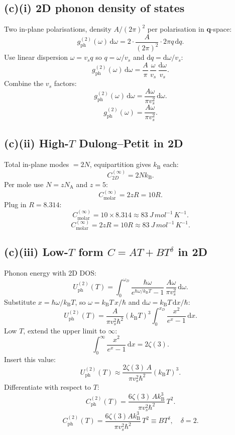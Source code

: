 \documentclass[11pt]{article}
\newcommand{\de}{\mathrm{d}}
\newcommand{\kB}{k_{\mathrm{B}}}
\newcommand{\NA}{N_{\mathrm{A}}}
\begin{document}
\subsection*{(c)(i) 2D phonon density of states}

Two in-plane polarisations, density $A/(2\pi)^2$ per polarisation in $\mathbf q$-space:
\[
g_{\mathrm{ph}}^{(2)}(\omega)\,\de\omega = 2\cdot\frac{A}{(2\pi)^2}\cdot 2\pi q\,\de q.
\]
Use linear dispersion $\omega = v_s q$ so $q = \omega/v_s$ and $\de q = \de\omega/v_s$:
\[
g_{\mathrm{ph}}^{(2)}(\omega)\,\de\omega = \frac{A}{\pi}\,\frac{\omega}{v_s}\,\frac{\de\omega}{v_s}.
\]
Combine the $v_s$ factors:
\[
g_{\mathrm{ph}}^{(2)}(\omega)\,\de\omega = \frac{A\omega}{\pi v_s^2}\,\de\omega.
\]
\begin{equation}
\boxed{\ g_{\mathrm{ph}}^{(2)}(\omega) = \frac{A\omega}{\pi v_s^2}.\ }
\label{eq:g2Dbox}
\end{equation}

\subsection*{(c)(ii) High-$T$ Dulong--Petit in 2D}

Total in-plane modes $=2N$, equipartition gives $\kB$ each:
\[
C^{(\infty)}_{2D} = 2N\kB.
\]
Per mole use $N=z\NA$ and $z=5$:
\[
C^{(\infty)}_{\mathrm{molar}} = 2zR = 10R.
\]
Plug in $R=8.314$:
\[
C^{(\infty)}_{\mathrm{molar}} = 10\times 8.314 \approx \SI{83}{J\,mol^{-1}\,K^{-1}}.
\]
\begin{equation}
\boxed{\ C^{(\infty)}_{\mathrm{molar}} = 2zR = 10R \approx \SI{83}{J\,mol^{-1}\,K^{-1}}.\ }
\label{eq:DP2Dbox}
\end{equation}

\subsection*{(c)(iii) Low-$T$ form $C=AT+BT^\delta$ in 2D}

Phonon energy with 2D DOS:
\[
U_{\mathrm{ph}}^{(2)}(T) = \int_0^{\omega_D}\frac{\hbar\omega}{e^{\hbar\omega/\kB T}-1}\,\frac{A\omega}{\pi v_s^2}\,\de\omega.
\]
Substitute $x=\hbar\omega/\kB T$, so $\omega = \kB T\,x/\hbar$ and $\de\omega = \kB T\,\de x/\hbar$:
\[
U_{\mathrm{ph}}^{(2)}(T) = \frac{A}{\pi v_s^2 \hbar^2}(\kB T)^3\int_0^{x_D}\frac{x^2}{e^x-1}\,\de x.
\]
Low $T$, extend the upper limit to $\infty$:
\[
\int_0^{\infty}\frac{x^2}{e^x-1}\,\de x = 2\zeta(3).
\]
Insert this value:
\[
U_{\mathrm{ph}}^{(2)}(T) \approx \frac{2\zeta(3)\,A}{\pi v_s^2 \hbar^2}(\kB T)^3.
\]
Differentiate with respect to $T$:
\[
C^{(2)}_{\mathrm{ph}}(T) = \frac{6\zeta(3)\,A\kB^3}{\pi v_s^2 \hbar^2}\,T^2.
\]
\begin{equation}
\boxed{\ C^{(2)}_{\mathrm{ph}}(T) = \frac{6\zeta(3)A\kB^3}{\pi v_s^2 \hbar^2}\,T^2 \equiv B T^\delta,\quad \delta=2.\ }
\label{eq:CphLowT2D}
\end{equation}
\end{document}
